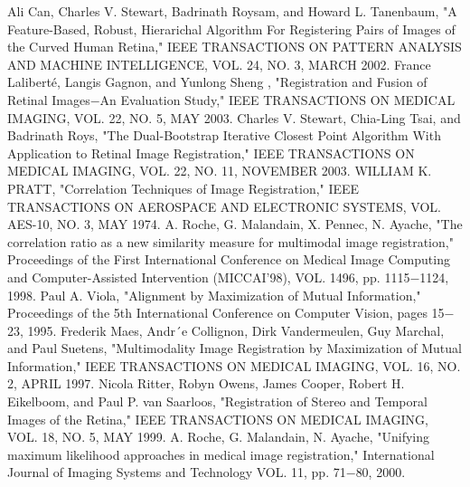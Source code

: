 \begin{thebibliography}{300}
 Ali Can, Charles V. Stewart, Badrinath Roysam, and Howard L. Tanenbaum, "A Feature-Based, Robust, Hierarichal Algorithm For Registering Pairs of Images of the Curved Human Retina," IEEE TRANSACTIONS ON PATTERN ANALYSIS AND MACHINE INTELLIGENCE, VOL. 24, NO. 3, MARCH 2002. %
 France Laliberté, Langis Gagnon, and Yunlong Sheng , "Registration and Fusion of Retinal Images$-$An Evaluation Study," IEEE TRANSACTIONS ON MEDICAL IMAGING, VOL. 22, NO. 5, MAY 2003.%
 Charles V. Stewart, Chia-Ling Tsai, and Badrinath Roys, "The Dual-Bootstrap Iterative Closest Point Algorithm With Application to Retinal Image Registration," IEEE TRANSACTIONS ON MEDICAL IMAGING, VOL. 22, NO. 11, NOVEMBER 2003.%
 WILLIAM K. PRATT, "Correlation Techniques of Image Registration," IEEE TRANSACTIONS ON AEROSPACE AND ELECTRONIC SYSTEMS, VOL. AES-10, NO. 3, MAY 1974.%
 A. Roche, G. Malandain, X. Pennec, N. Ayache, "The correlation ratio as a new similarity measure for multimodal image registration," Proceedings of the First International Conference on Medical Image Computing and Computer-Assisted Intervention (MICCAI'98), VOL. 1496, pp. 1115$-$1124, 1998.%
 Paul A. Viola, "Alignment by Maximization of Mutual Information," Proceedings of the 5th International Conference on Computer Vision, pages 15$-$23, 1995. %
 Frederik Maes, Andr´e Collignon, Dirk Vandermeulen, Guy Marchal, and Paul Suetens, "Multimodality Image Registration by Maximization of Mutual Information," IEEE TRANSACTIONS ON MEDICAL IMAGING, VOL. 16, NO. 2, APRIL 1997.%
 Nicola Ritter, Robyn Owens, James Cooper, Robert H. Eikelboom, and Paul P. van Saarloos, "Registration of Stereo and Temporal Images of the Retina," IEEE TRANSACTIONS ON MEDICAL IMAGING, VOL. 18, NO. 5, MAY 1999. %
 A. Roche, G. Malandain, N. Ayache, "Unifying maximum likelihood approaches in medical image registration," International Journal of Imaging Systems and Technology VOL. 11, pp. 71$-$80, 2000.%

\end{thebibliography}
